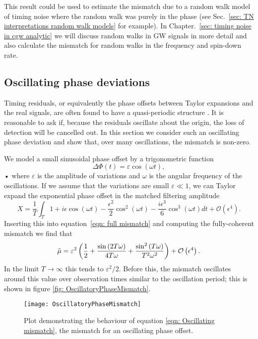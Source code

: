 \documentclass[../full_thesis/full_thesis.tex]{subfiles}
\begin{document}
This result could be used to estimate the mismatch due to a random walk model
of timing noise where the random walk was purely in the phase (see
Sec.~\ref{sec: TN interpretations random walk models} for example). In
Chapter.~\ref{sec: timing noise in cgw analytic} we will discuss random walks
in GW signals in more detail and also calculate the
mismatch for random walks in the frequency and spin-down rate.

\subsection{Oscillating phase deviations}

Timing residuals, or equivalently the phase offsets between Taylor expansions
and the real signals, are often found to have a quasi-periodic structure
\citep{Hobbs2010}. It is reasonable to ask if, because the residuals oscillate
about the origin, the loss of detection will be cancelled out. In this section
we consider such an oscillating phase deviation and show that, over many
oscillations, the mismatch is non-zero.

We model a small sinusoidal phase offset by a trigonometric function
\begin{equation}
\Delta \Phi(t) = \varepsilon \cos(\omega t),
\end{equation}•
where $\varepsilon$ is the amplitude of variations and $\omega$ is the angular
frequency of the oscillations. If we assume that the variations are small
$\varepsilon \ll 1$, we can Taylor expand the exponential phase offset in
the matched filtering amplitude
\begin{equation}
X = \frac{1}{T}\int_{T}
1 + i \epsilon \cos{\left (\omega t \right )}
- \frac{\epsilon^{2}}{2} \cos^{2}{\left (\omega t \right )}
- \frac{i \epsilon^{3}}{6} \cos^{3}{\left (\omega t \right )}
dt
+ \mathcal{O}\left(\epsilon^{4}\right).
\end{equation}
Inserting this into equation~\eqref{eqn: full mismatch} and computing the
fully-coherent mismatch we find that
\begin{equation}
\tilde{\mu} = \varepsilon^{2} \left(\frac{1}{2}
+ \frac{\sin{\left (2 T \omega \right )}}{4 T \omega}
+ \frac{\sin^{2}{\left (T \omega \right )}}{T^{2} \omega^{2}} \right)
+ \mathcal{O}\left(\epsilon^{4}\right).
\label{eqn: Oscillating mismatch}
\end{equation}
In the limit $T \rightarrow \infty$ this tends to $\varepsilon^{2}/2$. Before
this, the mismatch oscillates around this value over observation times similar
to the oscillation period; this is shown in figure \ref{fig:
OscillatoryPhaseMismatch}.
\begin{figure}[ht]
\centering
\texttt{[image: OscillatoryPhaseMismatch]}
\caption{Plot demonstrating the behaviour of equation
         \eqref{eqn: Oscillating mismatch}, the mismatch for an oscillating
         phase offset.}
\label{fig: OscillatoryPhaseMismatch}
\end{figure}
\end{document}
